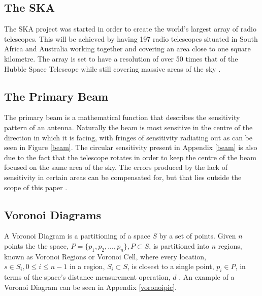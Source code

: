 \documentclass{article}
\begin{document}
\subsection{The SKA}\label{ska}
The SKA project was started in order to create the world's largest array of radio telescopes. This will be achieved by having 197 radio telescopes situated in South Africa and Australia working together and covering an area close to one square kilometre. The array is set to have a resolution of over 50 times that of the Hubble Space Telescope while still covering massive areas of the sky \cite{SKAsite}.
\subsection{The Primary Beam}\label{tpb}
The primary beam is a mathematical function that describes the sensitivity pattern of an antenna. Naturally the beam is most sensitive in the centre of the direction in which it is facing, with fringes of sensitivity radiating out as can be seen in Figure \ref{beam}. The circular sensitivity present in Appendix \ref{beam} is also due to the fact that the telescope rotates in order to keep the centre of the beam focused on the same area of the sky. The errors produced by the lack of sensitivity in certain areas can be compensated for, but that lies outside the scope of this paper \cite{oleg}.
\subsection{Voronoi Diagrams}\label{tess}
A Voronoi Diagram is a partitioning of a space $S$ by a set of points. Given $n$ points the the space, $P = \{p_1,p_2,...,p_n\}, P \subset S$, is partitioned into $n$ regions, known as Voronoi Regions or Voronoi Cell, where every location, $s \in S_i,0 \leq i \leq n-1$ in a region, $S_i \subset S$, is closest to a single point, $p_i \in P$, in terms of the space's distance measurement operation, $d$ \cite{okabe2009spatial}. An example of a Voronoi Diagram can be seen in Appendix \ref{voronoipic}.
\end{document}
